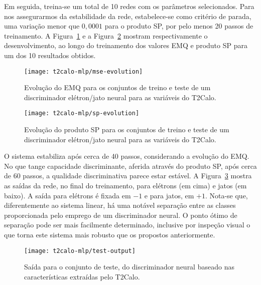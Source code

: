 Em seguida, treina-se um total de 10 redes com os parâmetros
selecionados. Para nos assegurarmos da estabilidade da rede, estabelece-se
como critério de parada, uma variação menor que $0,0001$ para o produto SP,
por pelo menos 20 passos de treinamento. A
Figura~\ref{fig:best-t2calo-mlp-mse} e a Figura~\ref{fig:best-t2calo-mlp-sp}
mostram respectivamente o desenvolvimento, ao longo do treinamento dos valores
EMQ e produto SP para um dos 10 resultados obtidos.

\begin{figure}
\begin{center}
\texttt{[image: t2calo-mlp/mse-evolution]}
\end{center}
\caption{Evolução do EMQ para os conjuntos de treino e teste de um
discriminador elétron/jato neural para as variáveis do T2Calo.}
\label{fig:best-t2calo-mlp-mse}
\end{figure}

\begin{figure}
\begin{center}
\texttt{[image: t2calo-mlp/sp-evolution]}
\end{center}
\caption{Evolução do produto SP para os conjuntos de treino e teste de um
discriminador elétron/jato neural para as variáveis do T2Calo.}
\label{fig:best-t2calo-mlp-sp}
\end{figure}

O sistema estabiliza após cerca de 40 passos, considerando a evolução do
EMQ. No que tange capacidade discriminante, aferida através do produto SP,
após cerca de 60 passos, a qualidade discriminativa parece estar estável. A
Figura~\ref{fig:best-t2calo-mlp-output} mostra as saídas da rede, no final do
treinamento, para elétrons (em cima) e jatos (em baixo). A saída para elétrons
é fixada em $-1$ e para jatos, em $+1$. Nota-se que, diferentemente ao sistema
linear, há uma notável separação entre as classes proporcionada pelo emprego
de um discriminador neural. O ponto ótimo de separação pode ser mais
facilmente determinado, inclusive por inspeção visual o que torna este sistema
mais robusto que os propostos anteriormente.

\begin{figure}
\begin{center}
\texttt{[image: t2calo-mlp/test-output]}
\end{center}
\caption{Saída para o conjunto de teste, do discriminador neural baseado nas
características extraídas pelo T2Calo.}
\label{fig:best-t2calo-mlp-output}
\end{figure}

